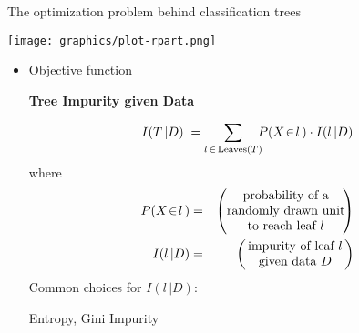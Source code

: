 \begin{frame}{\vskip -0.2cm \large The optimization problem behind classification trees}

\small

\begin{multicols}{2}

	\begin{center}
	\begin{minipage}{4.5cm}
	\texttt{[image: graphics/plot-rpart.png]}
	\end{minipage}
	\end{center}

\columnbreak

	\begin{flushleft}
	\begin{minipage}{6.0cm}
	\vskip -0.3cm
	\begin{itemize}
	\item
		{\Large Objective function}
		\vskip 0.3cm
		\begin{center}\textbf{Tree Impurity given Data}\end{center}
		\begin{equation*}
		I(T\,\vert D)
		\; =
			\underset{l\,\in\,\textnormal{Leaves}(T)}{\sum}\!\!
			P(X \!\in\! l\,) \cdot I(l\,\vert D)
		\end{equation*}
		{\scriptsize where}
		{\scriptsize\begin{eqnarray*}
		P(X \!\in\! l\,) &=& \left(\!\!\!\begin{array}{c}
			\textnormal{probability of a}
			\\
			\textnormal{randomly drawn unit}
			\\
			\textnormal{to reach leaf $l$}
			\end{array}\!\!\!\!\right)
		\\
		I(l\,\vert D) &=& \left(\!\!\begin{array}{c}
			\textnormal{impurity of leaf $l$}
			\\
			\textnormal{given data $D$}
			\end{array}\!\!\right)
		\end{eqnarray*}}
		{\scriptsize Common choices for $I(l\,\vert D)$:}
		\begin{center}
		\vskip -0.2cm
		Entropy,\;
		Gini Impurity
		\end{center}
	\end{itemize}
	\end{minipage}
	\end{flushleft}

\end{multicols}

\end{frame}
\normalsize

